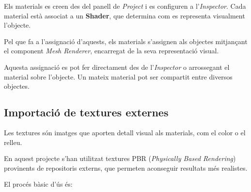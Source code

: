 \documentclass[12pt,a4paper]{report}
\begin{document}
Els materials es creen des del panell de \textit{Project} i es configuren a l'\textit{Inspector}. Cada material està associat a un \textbf{Shader}, que determina com es representa visualment l'objecte. \cite{UnityShaders}

Pel que fa a l'assignació d'aquests, els materials s'assignen als objectes mitjançant el component \textit{Mesh Renderer}, encarregat de la seva representació visual.

Aquesta assignació es pot fer directament des de l'\textit{Inspector} o arrossegant el material sobre l'objecte. Un mateix material pot ser compartit entre diversos objectes. \cite{UnityMaterialReference}


\subsection{Importació de textures externes}

Les textures són imatges que aporten detall visual als materials, com el color o el relleu. \cite{UnityMaterialsIntro}

En aquest projecte s'han utilitzat textures PBR (\textit{Physically Based Rendering}) provinents de repositoris externs, que permeten aconseguir resultats més realistes.

El procés bàsic d'ús és:
\end{document}
